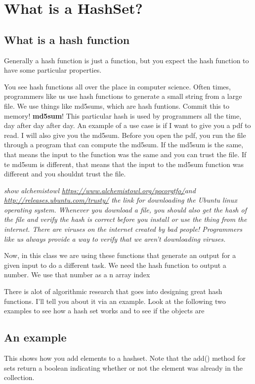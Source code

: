 \documentclass[12pt]{article}
\begin{document}
\section{What is a HashSet?}

\subsection{What is a hash function}
Generally a hash function is just a function, but you expect the hash function to have some particular properties. 

You see hash functions all over the place in computer science. Often times, programmers like us use hash functions to generate a small string from a large file. We use things like md5sums, which are hash funtions. Commit this to memory! \textbf{md5sum}! This particular hash is used by programmers all the time, day after day after day. An example of a use case is if I want to give you a pdf to read. I will also give you the md5sum. Before you open the pdf, you run the file through a program that can compute the md5sum. If the md5sum is the same, that means the input to the function was the same and you can trust the file. If te md5sum is different, that means that the input to the md5sum function was different and you shouldnt trust the file.

{\LARGE\textit{show alchemistowl \url{https://www.alchemistowl.org/pocorgtfo/}and \url{http://releases.ubuntu.com/trusty/} the link for downloading the Ubuntu linux operating system. Whenever you download a file, you should also get the hash of the file and verify the hash is correct before you install or use the thing from the internet. There are viruses on the internet created by bad people! Programmers like us always provide a way to verify that we aren't downloading viruses.}}

Now, in this class we are using these functions that generate an output for a given input to do a different task. We need the hash function to output a number. We use that number as a n array index

There is alot of algorithmic research that goes into designing great hash functions. I'll tell you about it via an example.  Look at the following two examples to see how a hash set works and to see if the objects are 

\subsection{An example}
This shows how you add elements to a hashset. Note that the add() method for sets return a boolean indicating whether or not the element was already in the collection.
\end{document}
